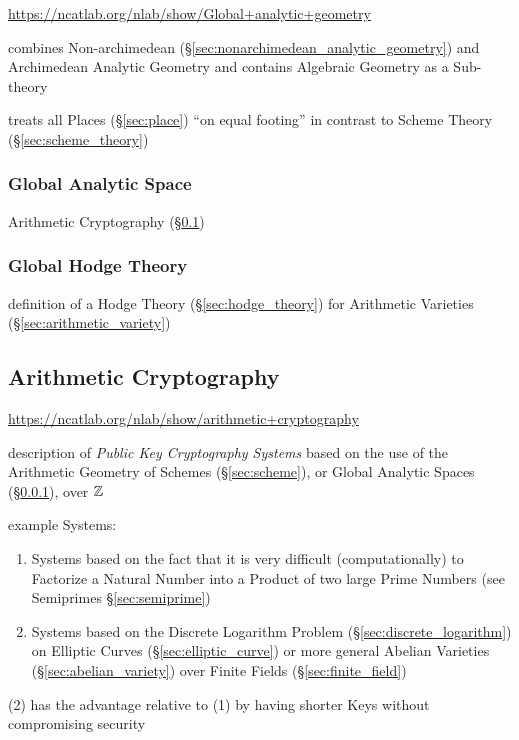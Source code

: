 \begin{itemize}
\begin{itemize}
\url{https://ncatlab.org/nlab/show/Global+analytic+geometry}

combines Non-archimedean (\S\ref{sec:nonarchimedean_analytic_geometry}) and
Archimedean Analytic Geometry and contains Algebraic Geometry as a Sub-theory

\fist treats all Places (\S\ref{sec:place}) ``on equal footing'' in contrast to
Scheme Theory (\S\ref{sec:scheme_theory})



\subsubsection{Global Analytic Space}\label{sec:global_analytic_space}

\fist Arithmetic Cryptography (\S\ref{sec:arithmetic_cryptography})



\subsubsection{Global Hodge Theory}\label{sec:global_hodge_theory}

definition of a Hodge Theory (\S\ref{sec:hodge_theory}) for Arithmetic
Varieties (\S\ref{sec:arithmetic_variety})



\subsection{Arithmetic Cryptography}\label{sec:arithmetic_cryptography}

\url{https://ncatlab.org/nlab/show/arithmetic+cryptography}

description of \emph{Public Key Cryptography Systems} based on the use of the
Arithmetic Geometry of Schemes (\S\ref{sec:scheme}), or Global Analytic Spaces
(\S\ref{sec:global_analytic_space}), over $\mathbb{Z}$

example Systems:
\begin{enumerate}
  \item Systems based on the fact that it is very difficult (computationally)
    to Factorize a Natural Number into a Product of two large Prime Numbers
    (see Semiprimes \S\ref{sec:semiprime})
  \item Systems based on the Discrete Logarithm Problem
    (\S\ref{sec:discrete_logarithm}) on Elliptic Curves
    (\S\ref{sec:elliptic_curve}) or more general Abelian Varieties
    (\S\ref{sec:abelian_variety}) over Finite Fields (\S\ref{sec:finite_field})
\end{enumerate}
(2) has the advantage relative to (1) by having shorter Keys without
compromising security


\end{itemize}
\end{itemize}
